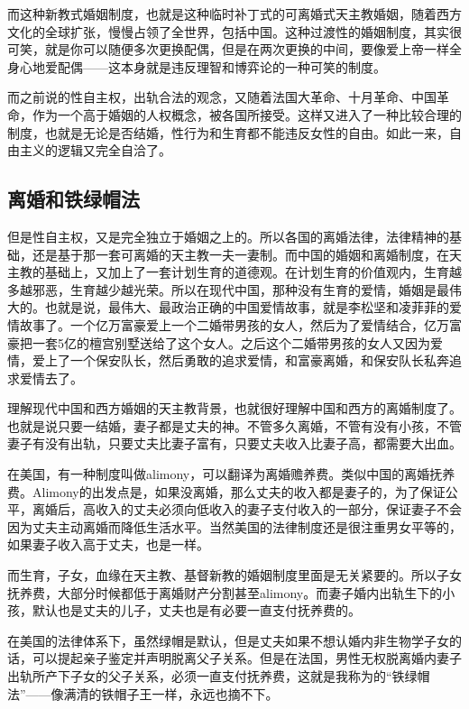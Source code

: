 而这种新教式婚姻制度，也就是这种临时补丁式的可离婚式天主教婚姻，随着西方文化的全球扩张，慢慢占领了全世界，包括中国。这种过渡性的婚姻制度，其实很可笑，就是你可以随便多次更换配偶，但是在两次更换的中间，要像爱上帝一样全身心地爱配偶——这本身就是违反理智和博弈论的一种可笑的制度。

而之前说的性自主权，出轨合法的观念，又随着法国大革命、十月革命、中国革命，作为一个高于婚姻的人权概念，被各国所接受。这样又进入了一种比较合理的制度，也就是无论是否结婚，性行为和生育都不能违反女性的自由。如此一来，自由主义的逻辑又完全自洽了。

\subsection{离婚和铁绿帽法}

但是性自主权，又是完全独立于婚姻之上的。所以各国的离婚法律，法律精神的基础，还是基于那一套可离婚的天主教一夫一妻制。而中国的婚姻和离婚制度，在天主教的基础上，又加上了一套计划生育的道德观。在计划生育的价值观内，生育越多越邪恶，生育越少越光荣。所以在现代中国，那种没有生育的爱情，婚姻是最伟大的。也就是说，最伟大、最政治正确的中国爱情故事，就是李松坚和凌菲菲的爱情故事了。一个亿万富豪爱上一个二婚带男孩的女人，然后为了爱情结合，亿万富豪把一套5亿的檀宫别墅送给了这个女人。之后这个二婚带男孩的女人又因为爱情，爱上了一个保安队长，然后勇敢的追求爱情，和富豪离婚，和保安队长私奔追求爱情去了。

理解现代中国和西方婚姻的天主教背景，也就很好理解中国和西方的离婚制度了。也就是说只要一结婚，妻子都是丈夫的神。不管多久离婚，不管有没有小孩，不管妻子有没有出轨，只要丈夫比妻子富有，只要丈夫收入比妻子高，都需要大出血。

在美国，有一种制度叫做alimony，可以翻译为离婚赡养费。类似中国的离婚抚养费。Alimony的出发点是，如果没离婚，那么丈夫的收入都是妻子的，为了保证公平，离婚后，高收入的丈夫必须向低收入的妻子支付收入的一部分，保证妻子不会因为丈夫主动离婚而降低生活水平。当然美国的法律制度还是很注重男女平等的，如果妻子收入高于丈夫，也是一样。

而生育，子女，血缘在天主教、基督新教的婚姻制度里面是无关紧要的。所以子女抚养费，大部分时候都低于离婚财产分割甚至alimony。而妻子婚内出轨生下的小孩，默认也是丈夫的儿子，丈夫也是有必要一直支付抚养费的。

在美国的法律体系下，虽然绿帽是默认，但是丈夫如果不想认婚内非生物学子女的话，可以提起亲子鉴定并声明脱离父子关系。但是在法国，男性无权脱离婚内妻子出轨所产下子女的父子关系，必须一直支付抚养费，这就是我称为的``铁绿帽法''——像满清的铁帽子王一样，永远也摘不下。

